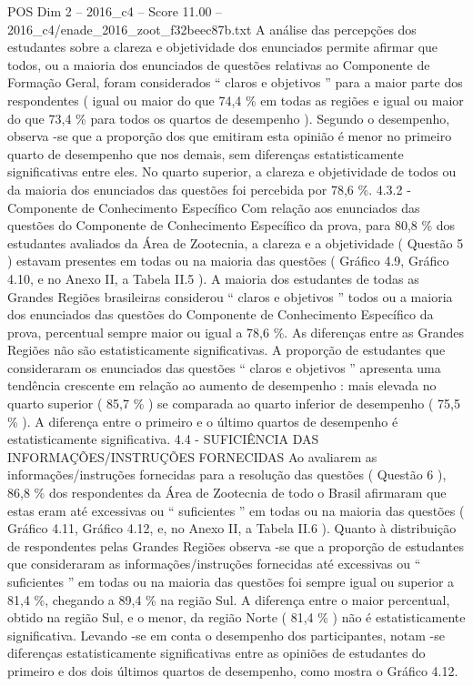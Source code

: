 \begin{textsample}{POS Dim 2 – 2016\_c4 – Score 11.00 – 2016\_c4/enade\_2016\_zoot\_f32beec87b.txt}
A análise das percepções dos estudantes sobre a clareza e objetividade dos enunciados permite afirmar que todos, ou a maioria dos enunciados de questões relativas ao Componente de Formação Geral, foram considerados “ claros e objetivos ” para a maior parte dos respondentes ( igual ou maior do que 74,4 \% em todas as regiões e igual ou maior do que 73,4 \% para todos os quartos de desempenho ).
Segundo o desempenho, observa -se que a proporção dos que emitiram esta opinião é menor no primeiro quarto de desempenho que nos demais, sem diferenças estatisticamente significativas entre eles.
No quarto superior, a clareza e objetividade de todos ou da maioria dos enunciados das questões foi percebida por 78,6 \%. 4.3.2 - Componente de Conhecimento Específico Com relação aos enunciados das questões do Componente de Conhecimento Específico da prova, para 80,8 \% dos estudantes avaliados da Área de Zootecnia, a clareza e a objetividade ( Questão 5 ) estavam presentes em todas ou na maioria das questões ( Gráfico 4.9, Gráfico 4.10, e no Anexo II, a Tabela II.5 ).
A maioria dos estudantes de todas as Grandes Regiões brasileiras considerou “ claros e objetivos ” todos ou a maioria dos enunciados das questões do Componente de Conhecimento Específico da prova, percentual sempre maior ou igual a 78,6 \%.
As diferenças entre as Grandes Regiões não são estatisticamente significativas.
A proporção de estudantes que consideraram os enunciados das questões “ claros e objetivos ” apresenta uma tendência crescente em relação ao aumento de desempenho : mais elevada no quarto superior ( 85,7 \% ) se comparada ao quarto inferior de desempenho ( 75,5 \% ).
A diferença entre o primeiro e o último quartos de desempenho é estatisticamente significativa. 4.4 - SUFICIÊNCIA DAS INFORMAÇÕES/INSTRUÇÕES FORNECIDAS Ao avaliarem as informações/instruções fornecidas para a resolução das questões ( Questão 6 ), 86,8 \% dos respondentes da Área de Zootecnia de todo o Brasil afirmaram que estas eram até excessivas ou “ suficientes ” em todas ou na maioria das questões ( Gráfico 4.11, Gráfico 4.12, e, no Anexo II, a Tabela II.6 ).
Quanto à distribuição de respondentes pelas Grandes Regiões observa -se que a proporção de estudantes que consideraram as informações/instruções fornecidas até excessivas ou “ suficientes ” em todas ou na maioria das questões foi sempre igual ou superior a 81,4 \%, chegando a 89,4 \% na região Sul.
A diferença entre o maior percentual, obtido na região Sul, e o menor, da região Norte ( 81,4 \% ) não é estatisticamente significativa.
Levando -se em conta o desempenho dos participantes, notam -se diferenças estatisticamente significativas entre as opiniões de estudantes do primeiro e dos dois últimos quartos de desempenho, como mostra o Gráfico 4.12.

\end{textsample}

